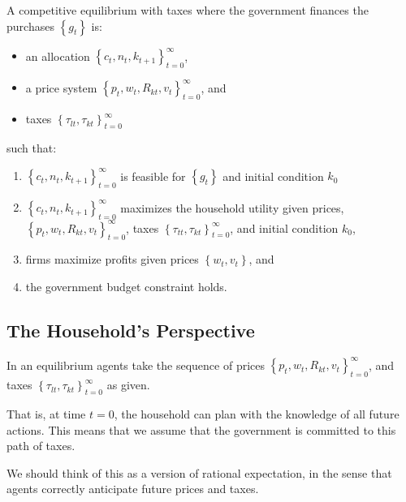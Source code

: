 \documentclass[10pt]{article}
\begin{document}
\begin{definition} 
    A competitive equilibrium with taxes where the government finances the purchases $\left\{g_t\right\}$ is:
    
    \begin{itemize}
        \item an allocation $\left\{c_t, n_t, k_{t+1}\right\}_{t=0}^{\infty}$,
        \item a price system $\left\{p_t, w_t, R_{k t}, v_t\right\}_{t=0}^{\infty}$, and
        \item taxes $\left\{\tau_{l t}, \tau_{k t}\right\}_{t=0}^{\infty}$
    \end{itemize}

    such that:

    \begin{enumerate}
        \item $\left\{c_t, n_t, k_{t+1}\right\}_{t=0}^{\infty}$ is feasible for $\left\{g_t\right\}$ and initial condition $k_0$
        \item $\left\{c_t, n_t, k_{t+1}\right\}_{t=0}^{\infty}$ maximizes the household utility given prices, $\left\{p_t, w_t, R_{k t}, v_t\right\}_{t=0}^{\infty}$, taxes $\left\{\tau_{t t}, \tau_{k t}\right\}_{t=0}^{\infty}$, and initial condition $k_0$,
        \item firms maximize profits given prices $\left\{w_t, v_t\right\}$, and
        \item the government budget constraint holds.
    \end{enumerate}

\end{definition}

\subsection{The Household's Perspective}

In an equilibrium agents take the sequence of prices $\left\{p_t, w_t, R_{k t}, v_t\right\}_{t=0}^{\infty}$, and taxes $\left\{\tau_{l t}, \tau_{k t}\right\}_{t=0}^{\infty}$ as given.

That is, at time $t=0$, the household can plan with the knowledge of all future actions. This means that we assume that the government is committed to this path of taxes.

We should think of this as a version of rational expectation, in the sense that agents correctly anticipate future prices and taxes.
\end{document}
